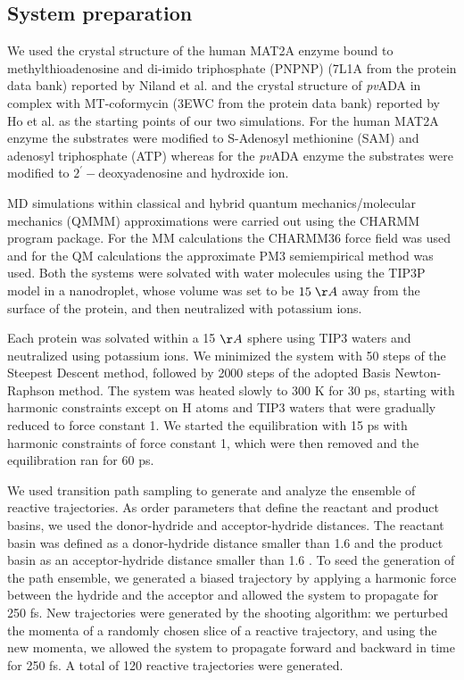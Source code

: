 \documentclass[journal=jpcbfk,manuscript=article,layout=traditional]{achemso}
\begin{document}
\subsection{System preparation}
We used the crystal structure of the human MAT2A enzyme 
bound to methylthioadenosine and di-imido triphosphate (PNPNP)
(7L1A from the protein data bank) reported by Niland 
et al. \cite{Niland21Biochem60p791} and the crystal structure of \textit{pv}ADA 
in complex with MT-coformycin (3EWC from the protein data bank) reported by Ho et 
al. \cite{Ho09Biochemistry48p9618} as the starting points of our two 
simulations. For the human MAT2A enzyme the substrates were modified to 
S-Adenosyl methionine (SAM) and adenosyl triphosphate (ATP) whereas for the \textit{pv}ADA
enzyme the substrates were modified to $2^{'}-$deoxyadenosine and hydroxide ion. 

MD simulations within classical and hybrid 
quantum mechanics/molecular mechanics (QMMM) approximations were carried out 
using the CHARMM program package. \cite{Brooks83JComputChem4p187,Brooks09JComputChem30p1545} 
For the MM calculations the CHARMM36 force field \cite{Brooks09JComputChem30p1545} 
was used and for the QM calculations the approximate PM3 semiempirical 
method \cite{Repasky02JComputChem23p1601} was used. Both the
systems were solvated with water molecules using the TIP3P model
in a nanodroplet, whose volume was set to be $15\;\AA$ away from
the surface of the protein, and then neutralized with potassium
ions.

Each protein was solvated within
a 15 $\AA$ sphere using TIP3 waters and neutralized using
potassium ions. We minimized the system with 50 steps of the
Steepest Descent method, followed by 2000 steps of the
adopted Basis Newton-Raphson method. The system was
heated slowly to 300 K for 30 ps, starting with harmonic
constraints except on H atoms and TIP3 waters that were
gradually reduced to force constant 1. We started the
equilibration with 15 ps with harmonic constraints of force
constant 1, which were then removed and the equilibration ran
for 60 ps.

We used transition path sampling to generate and
analyze the ensemble of reactive trajectories. As order
parameters that define the reactant and product basins, we
used the donor-hydride and acceptor-hydride distances. The
reactant basin was defined as a donor-hydride distance smaller
than 1.6  and the product basin as an acceptor-hydride
distance smaller than 1.6 . To seed the generation of the path
ensemble, we generated a biased trajectory by applying a
harmonic force between the hydride and the acceptor and
allowed the system to propagate for 250 fs. New trajectories
were generated by the shooting algorithm: we perturbed the
momenta of a randomly chosen slice of a reactive trajectory,
and using the new momenta, we allowed the system to
propagate forward and backward in time for 250 fs. A total of
120 reactive trajectories were generated.
\end{document}
